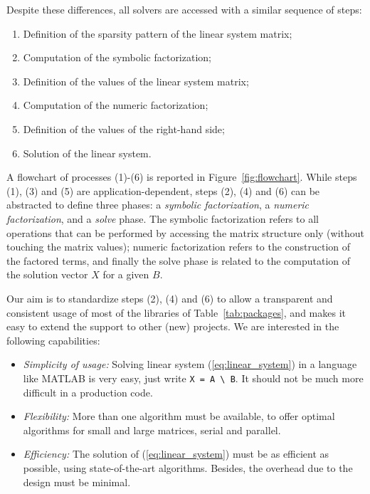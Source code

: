 \documentclass[acmtocl]{acmtrans2m}
\begin{document}
Despite these differences, all solvers are accessed with a similar sequence of
steps:
\begin{enumerate}
\item Definition of the sparsity pattern of the linear system matrix;
\item Computation of the symbolic factorization;
\item Definition of the values of the linear system matrix;
\item Computation of the numeric factorization;
\item Definition of the values of the right-hand side;
\item Solution of the linear system.
\end{enumerate}
A flowchart of processes (1)-(6) is reported in Figure~\ref{fig:flowchart}.
While steps (1), (3) and (5) are application-dependent, steps (2), (4) and
(6) can be abstracted to define three phases: a {\sl symbolic
factorization}, a {\sl numeric factorization}, and a {\sl solve} phase. The
symbolic factorization refers to all operations that can be performed by
accessing the matrix structure only (without touching the matrix values);
numeric factorization refers to the construction of the factored terms, and
finally the solve phase is related to the computation of the solution vector
$X$ for a given $B$.

Our aim is to standardize steps (2), (4)
and (6) to allow a transparent and consistent usage
of most of the libraries of Table~\ref{tab:packages}, and makes it easy
to extend the support to other (new) projects. We are interested in the
following capabilities:
\begin{itemize}

\item {\sl Simplicity of usage:} Solving linear system (\ref{eq:linear_system}) in a language
like MATLAB is very easy, just write \verb!X = A \ B!. It should not be much
more difficult in a production code.

\item {\sl Flexibility:} More than one algorithm must be available,
  to offer optimal algorithms for small and large matrices, serial and
  parallel.

\item {\sl Efficiency:} The solution of (\ref{eq:linear_system}) must be as
efficient as possible, using state-of-the-art algorithms. Besides, the
overhead due to the design must be minimal.
\end{itemize}
\end{document}
